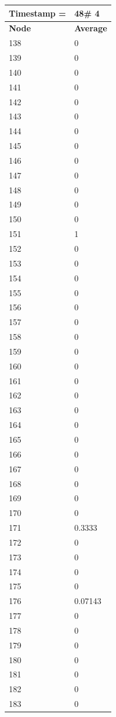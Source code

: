 \begin{tabular}{|l||l|}
\hline
\textbf{Timestamp =} & \textbf{48}\# 4\\\hline
	\textbf{Node} & \textbf{Average} \\ \hline
\hline
	138 & 0 \\ \hline
	139 & 0 \\ \hline
	140 & 0 \\ \hline
	141 & 0 \\ \hline
	142 & 0 \\ \hline
	143 & 0 \\ \hline
	144 & 0 \\ \hline
	145 & 0 \\ \hline
	146 & 0 \\ \hline
	147 & 0 \\ \hline
	148 & 0 \\ \hline
	149 & 0 \\ \hline
	150 & 0 \\ \hline
	151 & 1 \\ \hline
	152 & 0 \\ \hline
	153 & 0 \\ \hline
	154 & 0 \\ \hline
	155 & 0 \\ \hline
	156 & 0 \\ \hline
	157 & 0 \\ \hline
	158 & 0 \\ \hline
	159 & 0 \\ \hline
	160 & 0 \\ \hline
	161 & 0 \\ \hline
	162 & 0 \\ \hline
	163 & 0 \\ \hline
	164 & 0 \\ \hline
	165 & 0 \\ \hline
	166 & 0 \\ \hline
	167 & 0 \\ \hline
	168 & 0 \\ \hline
	169 & 0 \\ \hline
	170 & 0 \\ \hline
	171 & 0.3333 \\ \hline
	172 & 0 \\ \hline
	173 & 0 \\ \hline
	174 & 0 \\ \hline
	175 & 0 \\ \hline
	176 & 0.07143 \\ \hline
	177 & 0 \\ \hline
	178 & 0 \\ \hline
	179 & 0 \\ \hline
	180 & 0 \\ \hline
	181 & 0 \\ \hline
	182 & 0 \\ \hline
	183 & 0 \\ \hline
\end{tabular}
